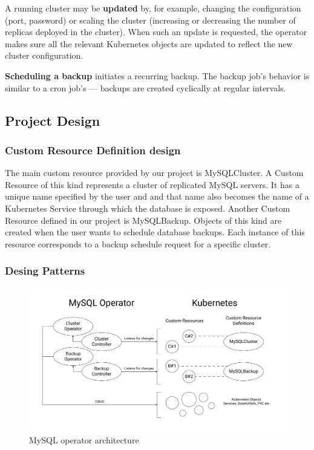 A running cluster may be \textbf{updated} by, for example, changing the configuration
(port, password) or scaling the cluster (increasing or decreasing the number of replicas
deployed in the cluster). When such an update is requested, the operator makes sure all
the relevant Kubernetes objects are updated to reflect the new cluster configuration.

\textbf{Scheduling a backup} initiates a recurring backup. The backup job’s behavior is
similar to a cron job’s --- backups are created cyclically at regular intervals.

\subsection{Project Design}

\subsubsection{Custom Resource Definition design}
The main custom resource provided by our project is MySQLCluster. A Custom Resource of
this kind represents a cluster of replicated MySQL servers. It has a unique name specified
by the user and and that name also becomes the name of a Kubernetes Service through which
the database is exposed. Another Custom Resource defined in our project is MySQLBackup.
Objects of this kind are created when the user wants to schedule database backups. Each
instance of this resource corresponds to a backup schedule request for a specific cluster.

\subsubsection{Desing Patterns}
\begin{figure}[!ht]
    \centering
    \includegraphics[width=1\textwidth, angle=0]{img/MySQLOperator.pdf}
    \caption{MySQL operator architecture}
\end{figure}

